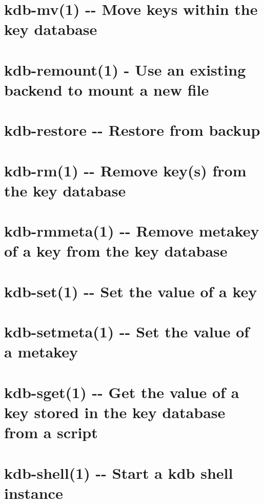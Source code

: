 \documentclass[twoside]{book}
\newcommand{\+}{\discretionary{\mbox{\scriptsize$\hookleftarrow$}}{}{}}
\begin{document}
\chapter{kdb-\/mv(1) -\/-\/ Move keys within the key database}
\label{md_doc_help_kdb-mv}

\chapter{kdb-\/remount(1) -\/ Use an existing backend to mount a new file}
\label{md_doc_help_kdb-remount}

\chapter{kdb-\/restore -\/-\/ Restore from backup}
\label{md_doc_help_kdb-restore}

\chapter{kdb-\/rm(1) -\/-\/ Remove key(s) from the key database}
\label{md_doc_help_kdb-rm}

\chapter{kdb-\/rmmeta(1) -\/-\/ Remove metakey of a key from the key database}
\label{md_doc_help_kdb-rmmeta}

\chapter{kdb-\/set(1) -\/-\/ Set the value of a key}
\label{md_doc_help_kdb-set}

\chapter{kdb-\/setmeta(1) -\/-\/ Set the value of a metakey}
\label{md_doc_help_kdb-setmeta}

\chapter{kdb-\/sget(1) -\/-\/ Get the value of a key stored in the key database from a script}
\label{md_doc_help_kdb-sget}

\chapter{kdb-\/shell(1) -\/-\/ Start a kdb shell instance}
\label{md_doc_help_kdb-shell}

\end{document}

